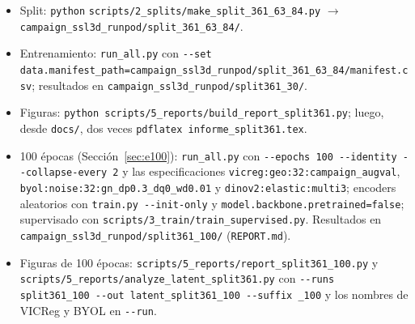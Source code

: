 \documentclass[11pt,a4paper]{article}
\begin{document}
\begin{itemize}
\item Split: \texttt{python} \nolinkurl{scripts/2_splits/make_split_361_63_84.py}
  $\rightarrow$ \nolinkurl{campaign_ssl3d_runpod/split_361_63_84/}.
\item Entrenamiento: \nolinkurl{run_all.py} con \texttt{-{}-set}
  \nolinkurl{data.manifest_path=campaign_ssl3d_runpod/split_361_63_84/manifest.csv};
  resultados en \nolinkurl{campaign_ssl3d_runpod/split361_30/}.
\item Figuras: \texttt{python scripts/5\_reports/build\_report\_split361.py}; luego, desde \texttt{docs/},
  dos veces \texttt{pdflatex informe\_split361.tex}.
\item 100 épocas (Sección~\ref{sec:e100}): \nolinkurl{run_all.py} con \texttt{-{}-epochs 100
  -{}-identity -{}-collapse-every 2} y las especificaciones
  \nolinkurl{vicreg:geo:32:campaign_augval}, \nolinkurl{byol:noise:32:gn_dp0.3_dq0_wd0.01} y
  \nolinkurl{dinov2:elastic:multi3}; encoders aleatorios con \nolinkurl{train.py --init-only}
  y \nolinkurl{model.backbone.pretrained=false}; supervisado con
  \nolinkurl{scripts/3_train/train_supervised.py}. Resultados en
  \nolinkurl{campaign_ssl3d_runpod/split361_100/} (\texttt{REPORT.md}).
\item Figuras de 100 épocas: \nolinkurl{scripts/5_reports/report_split361_100.py} y
  \nolinkurl{scripts/5_reports/analyze_latent_split361.py} con \texttt{-{}-runs split361\_100 -{}-out
  latent\_split361\_100 -{}-suffix \_100} y los nombres de VICReg y BYOL en \texttt{-{}-run}.
\end{itemize}
\end{document}
